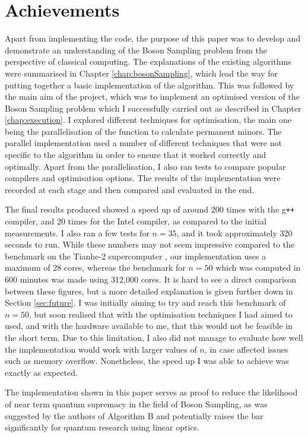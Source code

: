 \documentclass[ %
                    author={Manan Vaswani},
                supervisor={Dr. Raphael Clifford},
                    degree={MEng},
                     title={A multi-core CPU implementation of the classical Boson Sampling algorithm},
                  subtitle={},
                      type={},
                      year={2019} ]{dissertation}
\theoremstyle{plain}
\theoremstyle{definition}
\begin{document}
\section{Achievements}
Apart from implementing the code, the purpose of this paper was to develop and demonstrate an understanding of the Boson Sampling problem from the perspective of classical computing. The explanations of the existing algorithms were summarised in Chapter \ref{chap:bosonSampling}, which lead the way for putting together a basic implementation of the algorithm. This was followed by the main aim of the project, which was to implement an optimised version of the Boson Sampling problem which I successfully carried out as described in Chapter \ref{chap:execution}. I explored different techniques for optimisation, the main one being the parallelisation of the function to calculate permanent minors. The parallel implementation used a number of different techniques that were not specific to the algorithm in order to ensure that it worked correctly and optimally. Apart from the parallelisation, I also ran tests to compare popular compilers and optimisation options. The results of the implementation were recorded at each stage and then compared and evaluated in the end.

The final results produced showed a speed up of around 200 times with the g\texttt{++} compiler, and 20 times for the Intel compiler, as compared to the initial measurements. I also ran a few tests for $n=35$, and it took approximately 320 seconds to run. While these numbers may not seem impressive compared to the benchmark on the Tianhe-2 supercomputer \cite{wu2018}, our implementation uses a maximum of 28 cores, whereas the benchmark for $n=50$ which was computed in 600 minutes was made using 312,000 cores. It is hard to see a direct comparison between these figures, but a more detailed explanation is given further down in Section \ref{sec:future}. I was initially aiming to try and reach this benchmark of $n=50$, but soon realised that with the optimisation techniques I had aimed to used, and with the hardware available to me, that this would not be feasible in the short term. Due to this limitation, I also did not manage to evaluate how well the implementation would work with larger values of $n$, in case affected issues such as memory overflow. Nonetheless, the speed up I was able to achieve was exactly as expected.

The implementation shown in this paper serves as proof to reduce the likelihood of near term quantum supremacy in the field of Boson Sampling, as was suggested by the authors of Algorithm B \cite{clifford17} and potentially raises the bar significantly for quantum research using linear optics.
\end{document}
